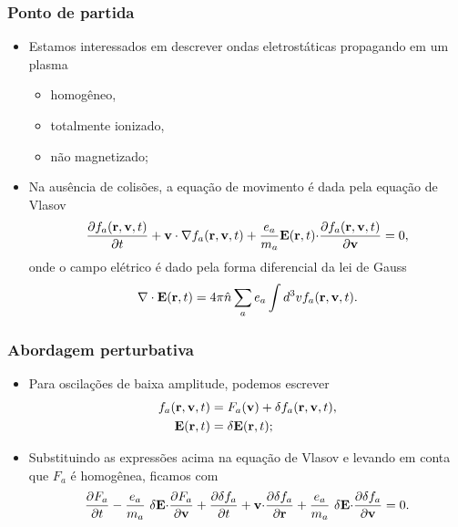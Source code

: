 \documentclass[10pt,aspectratio=1610,lualatex]{beamer}
\begin{document}
\begin{frame}
  \frametitle{Ponto de partida}
  \begin{itemize}
    \item Estamos interessados em descrever ondas eletrostáticas
    propagando em um plasma
    \begin{itemize}
      \item homogêneo,
      \item totalmente ionizado,
      \item não magnetizado;
    \end{itemize}
    \vspace{0.3cm}
    \item Na ausência de colisões, a equação de movimento é dada
    pela equação de Vlasov
    \begin{equation}
  \label{vlasov-nl}
  \frac{\partial f_a({\bf r}, {\bf v},t)}{\partial t}
  +{\bf v \cdot \nabla}f_a({\bf r}, {\bf v},t)
  +\frac{e_a}{m_a}{\bf E}({\bf r},t){\bf \cdot}
  \frac{\partial f_a({\bf r},{\bf v},t)}{\partial \bf v}=0,
    \end{equation}
    onde o campo elétrico é dado pela forma diferencial da lei de Gauss
    \begin{equation}
   {\bf \nabla \cdot E}({\bf r},t)
   =4\pi \hat n \sum_a e_a\int d^3 v f_a({\bf r}, {\bf v},t). 
  \end{equation}
  \end{itemize}
\end{frame}

\begin{frame}
  \frametitle{Abordagem perturbativa}
  \begin{itemize}
    \item Para oscilações de baixa amplitude, podemos escrever
    \begin{equation*}
      \begin{split}
	f_a({\bf r}, {\bf v},t)&=F_a({\bf v})
	+\delta f_a({\bf r}, {\bf v},t),\\
      {\bf E}({\bf r},t)&=\delta {\bf E}({\bf r},t);
    \end{split}
    \end{equation*}
    \vspace{0.4cm}
    \item Substituindo as expressões acima na equação de Vlasov
    e levando em conta que $F_a$ é homogênea, ficamos com
    \begin{equation}
      \frac{\partial F_a}{\partial t}-\frac{e_a}{m_a}\
      \delta {\bf E \cdot} \frac{\partial F_a}{\partial \bf v}
      +\frac{\partial \delta f_a}{\partial t}+{\bf v \cdot}
      \frac{\partial \delta f_a}{\partial {\bf r}}
      +\frac{e_a}{m_a}\ \delta {\bf E \cdot}
      \frac{\partial \delta f_a}{\partial \bf v}=0.
      \label{turb_ave_vlasov}
    \end{equation}
  \end{itemize}
\end{frame}
\end{document}
